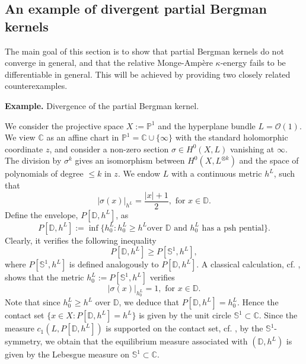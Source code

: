 \documentclass[12pt]{article}
\numberwithin{equation}{section}
\theoremstyle{theorem}
\theoremstyle{definition}
\theoremstyle{remark}
\newcommand{\comp}{\mathbb{C}}
\begin{document}
	\subsection{An example of divergent partial Bergman kernels}\label{sect_no_weak}
	The main goal of this section is to show that partial Bergman kernels do not converge in general, and that the relative Monge-Ampère $\kappa$-energy fails to be differentiable in general.
	This will be achieved by providing two closely related counterexamples.
	\par 
	\textbf{Example.} Divergence of the partial Bergman kernel.
	\par 
	We consider the projective space $X := \mathbb{P}^1$ and the hyperplane bundle $L = \mathscr{O}(1)$. 
	We view $\mathbb{C}$ as an affine chart in $\mathbb{P}^1 = \mathbb{C} \cup \{\infty\}$ with the standard holomorphic coordinate $z$, and consider a non-zero section $\sigma \in H^0(X, L)$ vanishing at $\infty$. 
	The division by $\sigma^{k}$ gives an isomorphism between $H^0(X, L^{\otimes k})$ and the space of polynomials of degree $\leq k$ in $z$. 
	We endow $L$ with a continuous metric $h^L$, such that 
	\begin{equation}
		|\sigma(x)|_{h^L} = \frac{|x| + 1}{2}, \text{ for } x \in \mathbb{D}.
	\end{equation}
	Define the envelope, $P[\mathbb{D}, h^L]$, as
	\begin{equation}
		P[\mathbb{D}, h^L] 
		:=
		\inf 
		\Big\{
			h^L_0 : h^L_0 \geq h^L \text{over $\mathbb{D}$ and } h^L_0 \text{ has a psh pential}
		\Big\}.
	\end{equation}
	Clearly, it verifies the following inequality
	\begin{equation}
		P[\mathbb{D}, h^L] 
		\geq
		P[\mathbb{S}^1, h^L],
	\end{equation}
	where $P[\mathbb{S}^1, h^L]$ is defined analogously to $P[\mathbb{D}, h^L]$.
	A classical calculation, cf. \cite[Exercise 4.13]{GuedjZeriahBook}, shows that the metric $h^L_0 := P[\mathbb{S}^1, h^L]$ verifies 
	\begin{equation}
		|\sigma(x)|_{h^L_0} = 1, \text{ for } x \in \mathbb{D}.
	\end{equation}
	Note that since $h^L_0 \geq h^L$ over $\mathbb{D}$, we deduce that $P[\mathbb{D}, h^L] = h^L_0$. 
	Hence the contact set $\{ x \in X : P[\mathbb{D}, h^L] = h^L \}$ is given by the unit circle $\mathbb{S}^1 \subset \comp$.
	Since the measure $c_1(L, P[\mathbb{D}, h^L])$ is supported on the contact set, cf. \cite[Exercise 5.10]{GuedjZeriahBook}, by the $\mathbb{S}^1$-symmetry, we obtain that the equilibrium measure associated with $(\mathbb{D}, h^L)$ is given by the Lebesgue measure on $\mathbb{S}^1 \subset \comp$.
\end{document}
